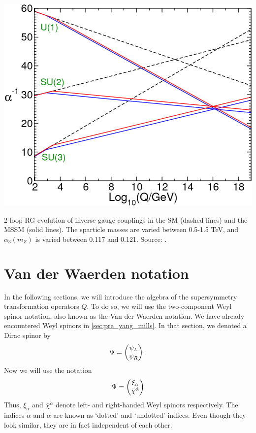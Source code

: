 \begin{marginfigure}[-4cm]
    \includegraphics[width=\textwidth]{images/gauge_coupling_unification}
  \caption{2-loop RG evolution of inverse gauge couplings in the SM (dashed lines) and the MSSM (solid lines). The sparticle masses are varied between 0.5-1.5 TeV, and $\alpha_3(m_Z)$ is varied between 0.117 and 0.121. Source: \citep{Martin1997}.}
  \label{fig:gauge_coupling_unification}
\end{marginfigure}

\section{Van der Waerden notation}
In the following sections, we will introduce the algebra of the supersymmetry transformation operators $Q$. To do so, we will use the two-component Weyl spinor notation, also known as the Van der Waerden notation. We have already encountered Weyl spinors in \autoref{sec:pre_yang_mills}. In that section, we denoted a Dirac spinor by
\begin{equation*}
\Psi = \begin{pmatrix} \psi_L \\ \psi_R\end{pmatrix}.
\end{equation*}
Now we will use the notation
\begin{equation*}
  \Psi = \begin{pmatrix} \xi_\alpha \\ \bar{\chi}^{\dot{\alpha}}\end{pmatrix}
\end{equation*}
Thus, $\xi_\alpha$ and $\bar{\chi}^{\dot{\alpha}}$ denote left- and right-handed Weyl spinors respectively. The indices $\alpha$ and $\dot{\alpha}$ are known as `dotted' and `undotted' indices. Even though they look similar, they are in fact independent of each other.

